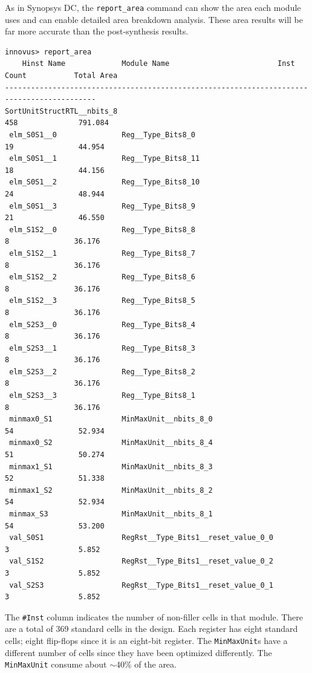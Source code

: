\documentclass[a4paper,12pt,twoside]{article}
\begin{document}
As in Synopsys DC, the \texttt{report\_area} command can show the area each module uses and can enable detailed area breakdown analysis. These area results will be far more accurate than the post-synthesis results.
\begin{verbatim}
innovus> report_area
    Hinst Name             Module Name                         Inst Count           Total Area
-------------------------------------------------------------------------------------------
SortUnitStructRTL__nbits_8                                            458              791.084
 elm_S0S1__0               Reg__Type_Bits8_0                           19               44.954
 elm_S0S1__1               Reg__Type_Bits8_11                          18               44.156
 elm_S0S1__2               Reg__Type_Bits8_10                          24               48.944
 elm_S0S1__3               Reg__Type_Bits8_9                           21               46.550
 elm_S1S2__0               Reg__Type_Bits8_8                            8               36.176
 elm_S1S2__1               Reg__Type_Bits8_7                            8               36.176
 elm_S1S2__2               Reg__Type_Bits8_6                            8               36.176
 elm_S1S2__3               Reg__Type_Bits8_5                            8               36.176
 elm_S2S3__0               Reg__Type_Bits8_4                            8               36.176
 elm_S2S3__1               Reg__Type_Bits8_3                            8               36.176
 elm_S2S3__2               Reg__Type_Bits8_2                            8               36.176
 elm_S2S3__3               Reg__Type_Bits8_1                            8               36.176
 minmax0_S1                MinMaxUnit__nbits_8_0                       54               52.934
 minmax0_S2                MinMaxUnit__nbits_8_4                       51               50.274
 minmax1_S1                MinMaxUnit__nbits_8_3                       52               51.338
 minmax1_S2                MinMaxUnit__nbits_8_2                       54               52.934
 minmax_S3                 MinMaxUnit__nbits_8_1                       54               53.200
 val_S0S1                  RegRst__Type_Bits1__reset_value_0_0          3                5.852
 val_S1S2                  RegRst__Type_Bits1__reset_value_0_2          3                5.852
 val_S2S3                  RegRst__Type_Bits1__reset_value_0_1          3                5.852
\end{verbatim}
The \texttt{\#Inst} column indicates the number of non-filler cells in that module. There are a total of 369 standard cells in the design. Each register has eight standard cells; eight flip-flops since it is an eight-bit register. The \texttt{MinMaxUnit}s have a different number of cells since they have been optimized differently. The \texttt{MinMaxUnit} consume about $\sim$40\% of the area.
\end{document}
